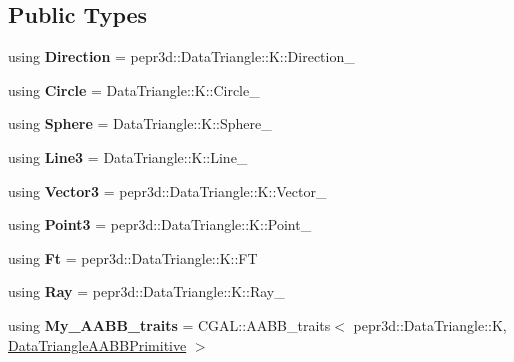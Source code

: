 \subsection*{Public Types}
\begin{DoxyCompactItemize}
\item 
\mbox{\label{classpepr3d_1_1_geometry_a6077ec326305ac7fe4c3f6819b53c2fb}} 
using {\bfseries Direction} = pepr3d\+::\+Data\+Triangle\+::\+K\+::\+Direction\+\_
\item 
\mbox{\label{classpepr3d_1_1_geometry_a44e4ffb13740677b37412b9863c8aedc}} 
using {\bfseries Circle} = Data\+Triangle\+::\+K\+::\+Circle\+\_
\item 
\mbox{\label{classpepr3d_1_1_geometry_a7fe4812fe3bdb9f9bf29b2a9ed9664ad}} 
using {\bfseries Sphere} = Data\+Triangle\+::\+K\+::\+Sphere\+\_
\item 
\mbox{\label{classpepr3d_1_1_geometry_a71ec638da1019894f11c1ca6a3b42e38}} 
using {\bfseries Line3} = Data\+Triangle\+::\+K\+::\+Line\+\_
\item 
\mbox{\label{classpepr3d_1_1_geometry_a9aeff66de9a33a389c3de9d0b836819b}} 
using {\bfseries Vector3} = pepr3d\+::\+Data\+Triangle\+::\+K\+::\+Vector\+\_
\item 
\mbox{\label{classpepr3d_1_1_geometry_ab8e951387d775d43de2581a925f89e7b}} 
using {\bfseries Point3} = pepr3d\+::\+Data\+Triangle\+::\+K\+::\+Point\+\_
\item 
\mbox{\label{classpepr3d_1_1_geometry_a2902716bce3c243a990d3b89b1e3e62b}} 
using {\bfseries Ft} = pepr3d\+::\+Data\+Triangle\+::\+K\+::\+FT
\item 
\mbox{\label{classpepr3d_1_1_geometry_abf08f06fad7e1acf0298bbb32418ef0a}} 
using {\bfseries Ray} = pepr3d\+::\+Data\+Triangle\+::\+K\+::\+Ray\+\_
\item 
\mbox{\label{classpepr3d_1_1_geometry_adec6ddfe2738bb0792535ad33da96f3a}} 
using {\bfseries My\+\_\+\+A\+A\+B\+B\+\_\+traits} = C\+G\+A\+L\+::\+A\+A\+B\+B\+\_\+traits$<$ pepr3d\+::\+Data\+Triangle\+::K, \mbox{\hyperlink{structpepr3d_1_1_data_triangle_a_a_b_b_primitive}{Data\+Triangle\+A\+A\+B\+B\+Primitive}} $>$

\end{DoxyCompactItemize}
